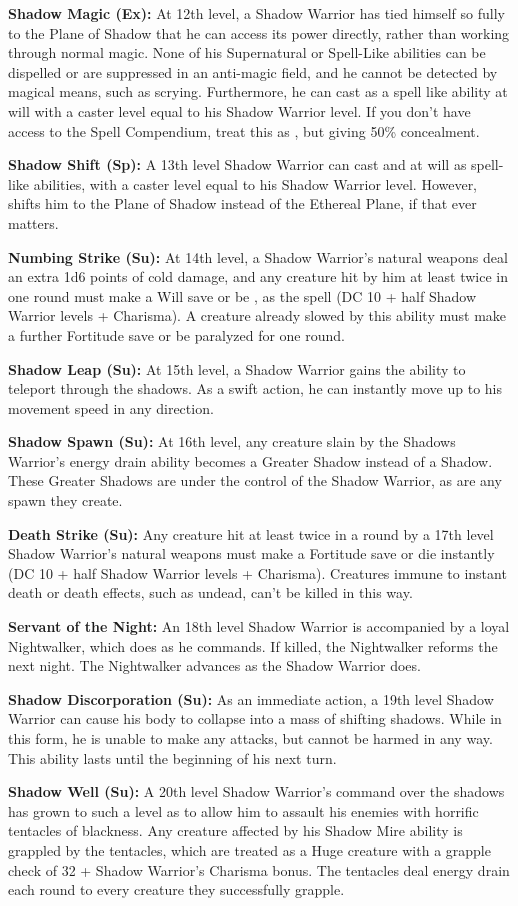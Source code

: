\textbf{Shadow Magic (Ex):} At 12th level, a Shadow Warrior has tied himself so fully to the Plane of Shadow that he can access its power directly, rather than working through normal magic. None of his Supernatural or Spell-Like abilities can be dispelled or are suppressed in an anti-magic field, and he cannot be detected by magical means, such as scrying. Furthermore, he can cast  as a spell like ability at will with a caster level equal to his Shadow Warrior level. If you don't have access to the Spell Compendium, treat this as , but giving 50\% concealment.

\textbf{Shadow Shift (Sp):} A 13th level Shadow Warrior can cast  and  at will as spell-like abilities, with a caster
level equal to his Shadow Warrior level. However,  shifts him to the Plane of Shadow instead of the Ethereal Plane, if that ever matters.

\textbf{Numbing Strike (Su):} At 14th level, a Shadow Warrior's natural weapons deal an extra 1d6 points of cold damage, and any creature
hit by him at least twice in one round must make a Will save or be , as the spell (DC 10 + half Shadow Warrior levels + Charisma). A creature already slowed by this ability must make a further Fortitude save or be paralyzed for one round.

\textbf{Shadow Leap (Su):} At 15th level, a Shadow Warrior gains the ability to teleport through the shadows. As a swift action, he can instantly move up to his movement speed in any direction.

\textbf{Shadow Spawn (Su):} At 16th level, any creature slain by the Shadows Warrior's energy drain ability becomes a Greater Shadow instead of a Shadow. These Greater Shadows are under the control of the Shadow Warrior, as are any spawn they create.

\textbf{Death Strike (Su):} Any creature hit at least twice in a round by a 17th level Shadow Warrior's natural weapons must make a Fortitude save or die instantly (DC 10 + half Shadow Warrior levels + Charisma). Creatures immune to instant death or death effects, such as undead, can't be killed in this way.

\textbf{Servant of the Night:} An 18th level Shadow Warrior is accompanied by a loyal Nightwalker, which does as he commands. If killed, the Nightwalker reforms the next night. The Nightwalker advances as the Shadow Warrior does.

\textbf{Shadow Discorporation (Su):} As an immediate action, a 19th level Shadow Warrior can cause his body to collapse into a mass of shifting shadows. While in this form, he is unable to make any attacks, but cannot be harmed in any way. This ability lasts until the beginning of his next turn.

\textbf{Shadow Well (Su):} A 20th level Shadow Warrior's command over the shadows has grown to such a level as to allow him to assault his enemies with horrific tentacles of blackness. Any creature affected by his Shadow Mire ability is grappled by the tentacles, which are treated as a Huge creature with a grapple check of 32 + Shadow Warrior's Charisma bonus. The tentacles deal energy drain each round to every creature they successfully grapple.
